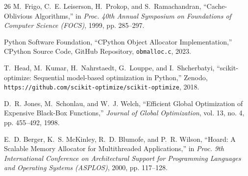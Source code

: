 \documentclass[conference]{IEEEtran}
\begin{document}
\begin{thebibliography}{26}
M.~Frigo, C.~E. Leiserson, H.~Prokop, and S.~Ramachandran, ``Cache-Oblivious Algorithms,'' in \emph{Proc. 40th Annual Symposium on Foundations of Computer Science (FOCS)}, 1999, pp. 285--297.

Python Software Foundation, ``CPython Object Allocator Implementation,'' CPython Source Code, GitHub Repository, \texttt{obmalloc.c}, 2023.

T.~Head, M.~Kumar, H.~Nahrstaedt, G.~Louppe, and I.~Shcherbatyi, ``scikit-optimize: Sequential model-based optimization in Python,'' Zenodo, \texttt{https://github.com/scikit-optimize/scikit-optimize}, 2018.

D.~R. Jones, M.~Schonlau, and W.~J. Welch, ``Efficient Global Optimization of Expensive Black-Box Functions,'' \emph{Journal of Global Optimization}, vol. 13, no. 4, pp. 455--492, 1998.

E.~D. Berger, K.~S. McKinley, R.~D. Blumofe, and P.~R. Wilson, ``Hoard: A Scalable Memory Allocator for Multithreaded Applications,'' in \emph{Proc. 9th International Conference on Architectural Support for Programming Languages and Operating Systems (ASPLOS)}, 2000, pp. 117--128.
\end{thebibliography}
\end{document}
